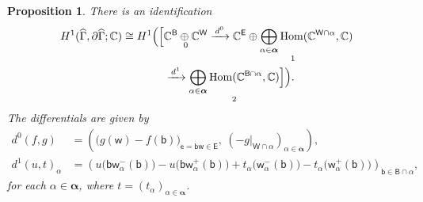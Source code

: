 \documentclass[dvipsnames,11pt]{article}
\newtheorem{proposition}[theorem]{Proposition}
\theoremstyle{definition}
\newcommand{\C}{{\mathbb C}}
\def\B{\mathsf B}
\def\W{\mathsf W}
\def\w{\mathsf w}
\def\b{\mathsf b}
\def\e{\mathsf e}
\def\E{\mathsf E}
\def\zz{\bm \alpha}
\DeclareMathOperator{\Hom}{Hom}
\begin{document}
\begin{proposition}\label{prop:relcoh}
There is an identification
\begin{equation}\label{eq:relcoh-concrete}
\begin{aligned}
H^1(\widehat\Gamma,\partial\widehat\Gamma;\C)
\cong
H^1\Bigl(\Bigl[
&
\underset{0}{\C^{\B}\oplus \C^{\W}}
\xrightarrow{\,d^{0}\,}
\underset{1}{\C^{\E}\oplus \displaystyle\bigoplus_{\alpha\in\zz}\Hom(\C^{\W\cap\alpha},\C)}\\
&\xrightarrow{\,d^{1}\,}
\underset{2}{\displaystyle\bigoplus_{\alpha\in\zz}\Hom(\C^{\B\cap\alpha},\C)}
\Bigr]\Bigr).
\end{aligned}
\end{equation}
The differentials are given by
\begin{align*}
d^{0}(f,g)
&=
\left(
\bigl(g(\w)-f(\b)\bigr)_{\e=\b\w\in\E},
\ (-g|_{\W\cap\alpha})_{\alpha\in\zz}
\right),\\
d^{1}(u,t)_\alpha
&=
\left(
u\bigl(\b \w_\alpha^{-}(\b)\bigr)
-
u\bigl(\b \w_\alpha^{+}(\b)\bigr)
+
t_\alpha\bigl(\w_\alpha^{-}(\b)\bigr)
-
t_\alpha\bigl(\w_\alpha^{+}(\b)\bigr)
\right)_{\b\in \B\cap\alpha},
\end{align*}
for each \(\alpha\in\zz\), where \(t=(t_\alpha)_{\alpha\in\zz}\).
\end{proposition}
\end{document}
